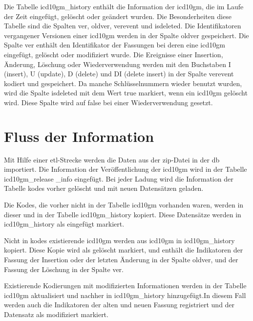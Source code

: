 Die Tabelle \glqq\textsf{icd10gm\_history}\grqq{} enthält die Information der \ac{icd10gm}, die im Laufe der Zeit eingefügt, gelöscht oder geändert wurden. Die Besonderheiten diese Tabelle sind die Spalten \glqq\textsf{ver}\grqq{}, \glqq\textsf{oldver}\grqq{}, \glqq\textsf{verevent}\grqq{} und \glqq\textsf{isdeleted}\grqq{}. Die Identifikatoren vergangener Versionen einer \ac{icd10gm} werden in der Spalte \glqq\textsf{oldver}\grqq{} gespeichert. Die Spalte \glqq\textsf{ver}\grqq{} enthält den Identifikator der Fassungen bei deren eine \ac{icd10gm} eingefügt, gelöscht oder modifiziert wurde. Die Ereignisse einer Insertion, Änderung, Löschung oder Wiederverwendung werden mit den Buchstaben \glqq\textsf{I}\grqq{} (insert), \glqq\textsf{U}\grqq{} (update), \glqq\textsf{D}\grqq{} (delete) und \glqq\textsf{DI}\grqq{} (delete insert) in der Spalte \glqq\textsf{verevent}\grqq{} kodiert und gespeichert. Da manche Schlüsselnummern wieder benutzt wurden, wird die Spalte \textsf{isdeleted} mit dem Wert \glqq true\grqq{} markiert, wenn ein \ac{icd10gm} gelöscht wird. Diese Spalte wird auf \glqq false\grqq{} bei einer Wiederverwendung gesetzt.

\section{Fluss der Information} \label{sec:dbrun}

Mit Hilfe einer \ac{etl}-Strecke werden die Daten aus der \ac{zip}-Datei in der \ac{db} importiert. Die Information der Veröffentlichung der \ac{icd10gm} wird in der Tabelle \glqq\textsf{icd10gm\_release \_info}\grqq{} eingefügt. Bei jeder Ladung wird die Information der Tabelle \glqq\textsf{kodes}\grqq{} vorher gelöscht und mit neuen Datensätzen geladen. 

Die Kodes, die vorher nicht in der Tabelle \glqq\textsf{icd10gm}\grqq{} vorhanden waren, werden in dieser und in der Tabelle \glqq\textsf{icd10gm\_history}\grqq{} kopiert. Diese Datensätze werden in \glqq\textsf{icd10gm\_history}\grqq{} als eingefügt markiert. 

Nicht in \glqq\textsf{kodes}\grqq{} existierende \ac{icd10gm} werden aus \glqq\textsf{icd10gm}\grqq{} in \glqq\textsf{icd10gm\_history}\grqq{} kopiert. Diese Kopie wird als gelöscht markiert, und enthält die Indikatoren der Fassung der Insertion oder der letzten Änderung in der Spalte \textsf{oldver}\grqq{}, und der Fassung der Löschung in der Spalte \glqq\textsf{ver}\grqq{}. 

Existierende Kodierungen mit modifizierten Informationen werden in der Tabelle \glqq\textsf{icd10gm}\grqq{} aktualisiert und nachher in \glqq\textsf{icd10gm\_history}\grqq{} hinzugefügt.In diesem Fall werden auch die Indikatoren der alten und neuen Fassung registriert und der Datensatz als modifiziert markiert.

